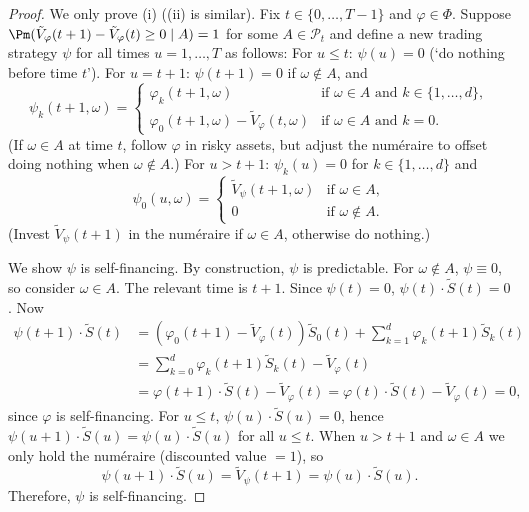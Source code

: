 \begin{proof}
	We only prove (i) ((ii) is similar). Fix $t\in\{0,\dots,T-1\}$ and $\varphi\in\Phi$. Suppose $\Pm(\tilde{V}_{\varphi}(t+1)-\tilde{V}_{\varphi}(t)\ge 0\mid A)=1$ for some $A\in\mathcal{P}_t$ and define a new trading strategy $\psi$ for all times $u=1,\dots,T$ as follows: For $u\le t$: $\psi(u)=0$ (‘do nothing before time $t$’). For $u=t+1$: $\psi(t+1)=0$ if $\omega\notin A$, and
	\[
		\psi_k(t+1,\omega)=\begin{cases}
			\varphi_k(t+1,\omega)                               & \text{if }\omega\in A\text{ and }k\in\{1,\dots,d\}, \\
			\varphi_0(t+1,\omega)-\tilde{V}_{\varphi}(t,\omega) & \text{if }\omega\in A\text{ and }k=0.
		\end{cases}
	\]
	(If $\omega\in A$ at time $t$, follow $\varphi$ in risky assets, but adjust the num\'eraire to offset doing nothing when $\omega\notin A$.) For $u>t+1$: $\psi_k(u)=0$ for $k\in\{1,\dots,d\}$ and
	\[
		\psi_0(u,\omega)=\begin{cases}
			\tilde{V}_{\psi}(t+1,\omega) & \text{if }\omega\in A,    \\
			0                            & \text{if }\omega\notin A.
		\end{cases}
	\]
	(Invest $\tilde{V}_{\psi}(t+1)$ in the num\'eraire if $\omega\in A$, otherwise do nothing.)

	We show $\psi$ is self-financing. By construction, $\psi$ is predictable. For $\omega\notin A$, $\psi\equiv 0$, so consider $\omega\in A$. The relevant time is $t+1$. Since $\psi(t)=0$, $\psi(t)\cdot\tilde{S}(t)=0$. Now
	\[
		\begin{aligned}
			\psi(t+1)\cdot\tilde{S}(t) & =(\varphi_0(t+1)-\tilde{V}_{\varphi}(t))\tilde{S}_0(t)+\sum_{k=1}^d \varphi_k(t+1)\tilde{S}_k(t)            \\
			                           & =\sum_{k=0}^d \varphi_k(t+1)\tilde{S}_k(t)-\tilde{V}_{\varphi}(t)                                           \\
			                           & =\varphi(t+1)\cdot\tilde{S}(t)-\tilde{V}_{\varphi}(t)=\varphi(t)\cdot\tilde{S}(t)-\tilde{V}_{\varphi}(t)=0,
		\end{aligned}
	\]
	since $\varphi$ is self-financing. For $u\le t$, $\psi(u)\cdot\tilde{S}(u)=0$, hence $\psi(u+1)\cdot\tilde{S}(u)=\psi(u)\cdot\tilde{S}(u)$ for all $u\le t$. When $u>t+1$ and $\omega\in A$ we only hold the num\'eraire (discounted value $=1$), so
	\[
		\psi(u+1)\cdot\tilde{S}(u)=\tilde{V}_{\psi}(t+1)=\psi(u)\cdot\tilde{S}(u).
	\]
	Therefore, $\psi$ is self-financing.


\end{proof}
